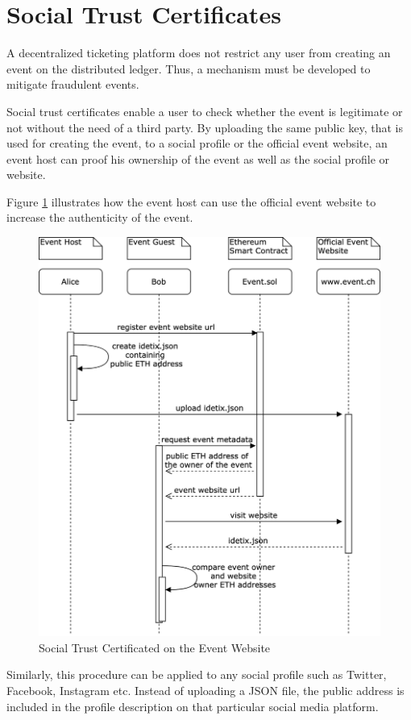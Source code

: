 
\section{Social Trust Certificates}\label{section:social-trust-certificates}

A decentralized ticketing platform does not restrict any user from creating an event on the distributed ledger. Thus, a mechanism must be developed to mitigate fraudulent events. 

Social trust certificates enable a user to check whether the event is legitimate or not without the need of a third party. By uploading the same public key, that is used for creating the event, to a social profile or the official event website, an event host can proof his ownership of the event as well as the social profile or website. 

Figure \ref{fig:trust-certificate-event-website} illustrates how the event host can use the official event website to increase the authenticity of the event. 

\begin{figure}[H]
    \centering
    \includegraphics[width=14cm]{figures/social-trust-certificates.png}
    \caption{Social Trust Certificated on the Event Website}
    \label{fig:trust-certificate-event-website}
\end{figure}

Similarly, this procedure can be applied to any social profile such as Twitter, Facebook, Instagram etc. Instead of uploading a JSON file, the public address is included in the profile description on that particular social media platform. 